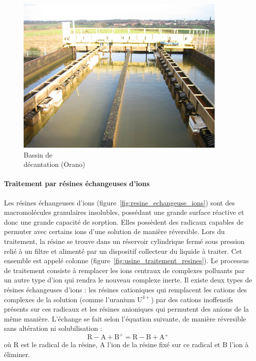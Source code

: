 \documentclass{article}
\begin{document}
\begin{figure}[H]
    \begin{minipage}{0.33\textwidth}
        \centering
        \includegraphics[width = 0.8\linewidth]{III_A_1.png}
        \caption{Bassin de \\décantation (Orano)}
        \label{fig:bassin_decantation}
        
    \end{minipage}\hfill
\end{figure}

\paragraph{Traitement par résines échangeuses d’ions} \hspace{1 em}

Les résines échangeuses d’ions (figure~\ref{fig:resine_echangeuse_ions}) sont des macromolécules granulaires insolubles, possédant une grande surface réactive et donc une grande capacité de sorption. Elles possèdent des radicaux capables de permuter avec certains ions d’une solution de manière réversible. Lors du traitement, la résine se trouve dans un réservoir cylindrique fermé sous pression relié à un filtre et alimenté par un dispositif collecteur du liquide à traiter. Cet ensemble est appelé colonne (figure~\ref{fig:usine_traitement_resines}). Le processus de traitement consiste à remplacer les ions centraux de complexes polluants par un autre type d’ion qui rendra le nouveau complexe inerte. Il existe deux types de résines échangeuses d’ions : les résines cationiques qui remplacent les cations des complexes de la solution (comme l’uranium $\text{U}^{4+}$) par des cations inoffensifs présents sur ces radicaux et les résines anioniques qui permutent des anions de la même manière. L’échange se fait selon l’équation suivante, de manière réversible sans altération ni solubilisation :
$$\text{R}\!-\!\text{A}\!\! + \text{B}^+ = \text{R}\!-\!\text{B}\! + \text{A}\!^+$$
où R est le radical de la résine, A l’ion de la résine fixé sur ce radical et B l’ion à éliminer.
\end{document}
